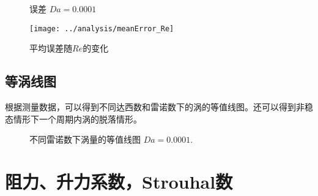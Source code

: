 \begin{figure}[!h]
	\centering
	\begin{minipage}{\textwidth}
		\centering
	\end{minipage}
	\centering
	\begin{minipage}{\textwidth}
		\centering
	\end{minipage}
	\caption{误差 $Da=0.0001$}
	\label{fig: resd}
\end{figure}

\begin{figure}[]
	\centering
	\texttt{[image: ../analysis/meanError\_Re]}
	\caption{平均误差随$Re$的变化}
	\label{fig: error}
\end{figure}

\subsection{等涡线图}

根据测量数据，可以得到不同达西数和雷诺数下的涡的等值线图。还可以得到非稳态情形下一个周期内涡的脱落情形。

\begin{figure}[]
	\centering
	\begin{minipage}{\textwidth}
		\centering
	\end{minipage}
	\centering
	\begin{minipage}{\textwidth}
		\centering
	\end{minipage}
	\centering
	\begin{minipage}{\textwidth}
		\centering
	\end{minipage}
	\caption{不同雷诺数下涡量的等值线图 $Da=0.0001$.}
\end{figure}

\section{阻力、升力系数，Strouhal数}

